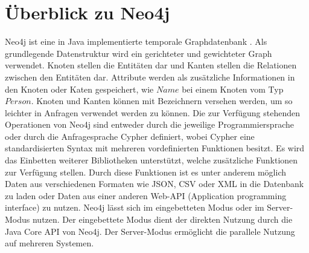 \section{Überblick zu Neo4j}
Neo4j ist eine in Java implementierte temporale Graphdatenbank \parencite{vukotic2015neo4j}. Als grundlegende Datenstruktur wird ein gerichteter und gewichteter Graph verwendet. Knoten stellen die Entitäten dar und  Kanten stellen die Relationen zwischen den Entitäten dar.  Attribute werden als zusätzliche Informationen in den Knoten oder Katen gespeichert, wie $Name$ bei einem Knoten vom Typ $Person$. Knoten und Kanten können mit Bezeichnern versehen werden, um so leichter in Anfragen  verwendet werden zu können. Die zur Verfügung stehenden Operationen von Neo4j sind entweder durch die jeweilige Programmiersprache oder durch die  Anfragesprache Cypher definiert, wobei Cypher eine standardisierten Syntax mit mehreren vordefinierten Funktionen besitzt. Es wird das Einbetten weiterer Bibliotheken unterstützt, welche  zusätzliche Funktionen zur Verfügung stellen. Durch diese Funktionen ist es unter anderem möglich Daten aus verschiedenen Formaten wie JSON, CSV oder XML in die Datenbank zu laden oder Daten aus einer anderen Web-API (Application programming interface) zu nutzen. Neo4j lässt sich im eingebetteten Modus oder im  Server-Modus nutzen. Der eingebettete Modus dient der direkten  Nutzung durch die Java Core API von Neo4j. Der Server-Modus ermöglicht die parallele Nutzung auf mehreren Systemen. 

